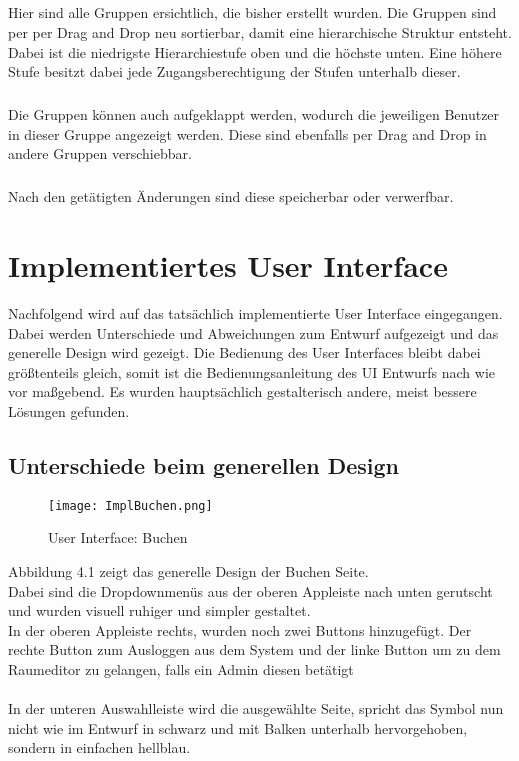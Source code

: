 \paragraph{}Hier sind alle Gruppen ersichtlich, die bisher erstellt wurden.
Die Gruppen sind per per Drag and Drop neu sortierbar, damit eine hierarchische Struktur entsteht.
Dabei ist die niedrigste Hierarchiestufe oben und die höchste unten. 
Eine höhere Stufe besitzt dabei jede Zugangsberechtigung der Stufen unterhalb dieser. 
\\
\paragraph{}Die Gruppen können auch aufgeklappt werden, wodurch die jeweiligen Benutzer in dieser Gruppe angezeigt werden.
Diese sind ebenfalls per Drag and Drop in andere Gruppen verschiebbar.
\\
\paragraph{}Nach den getätigten Änderungen sind diese speicherbar oder verwerfbar. 

\chapter{Implementiertes User Interface}
Nachfolgend wird auf das tatsächlich implementierte User Interface eingegangen.
Dabei werden Unterschiede und Abweichungen zum Entwurf aufgezeigt und das generelle Design wird gezeigt.
Die Bedienung des User Interfaces bleibt dabei größtenteils gleich, somit ist die Bedienungsanleitung des UI Entwurfs nach wie vor maßgebend.
Es wurden hauptsächlich gestalterisch andere, meist bessere Lösungen gefunden.

\section{Unterschiede beim generellen Design}

\begin{wrapfigure}[15]{r}{5.5cm}
  \texttt{[image: ImplBuchen.png]}
  \caption{User Interface: Buchen}
\end{wrapfigure}

Abbildung 4.1 zeigt das generelle Design der Buchen Seite.
\\
Dabei sind die Dropdownmenüs aus der oberen Appleiste nach unten gerutscht und wurden visuell ruhiger und simpler gestaltet.
\\
In der oberen Appleiste rechts, wurden noch zwei Buttons hinzugefügt. Der rechte Button zum Ausloggen aus dem System und der linke Button um zu dem Raumeditor zu gelangen, falls ein Admin diesen betätigt
\\\\
In der unteren Auswahlleiste wird die ausgewählte Seite, spricht das Symbol nun nicht wie im Entwurf in schwarz und mit Balken unterhalb hervorgehoben, sondern in einfachen hellblau.


